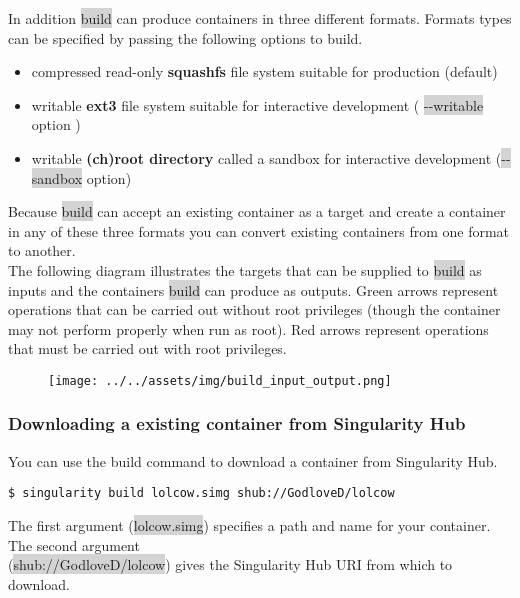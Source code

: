 \documentclass[a4paper]{article}
\begin{document}
In addition \colorbox{lightgray}{build} can produce containers in three different formats. Formats types can be specified by passing the following options to build.
\\
\begin{itemize}
\item compressed read-only \textbf{squashfs} file system suitable for production (default)
\item writable \textbf{ext3} file system suitable for interactive development ( \colorbox{lightgray}{-{}-writable} option )
\item writable \textbf{(ch)root directory} called a sandbox for interactive development (\colorbox{lightgray}{-{}-sandbox} option)
\end{itemize}

Because \colorbox{lightgray}{build} can accept an existing container as a target and create a container in any of these three formats you can convert existing containers from one format to another.\\

The following diagram illustrates the targets that can be supplied to \colorbox{lightgray}{build} as inputs and the containers \colorbox{lightgray}{build} can produce as outputs. Green arrows represent operations that can be carried out without root privileges (though the container may not perform properly when run as root). Red arrows represent operations that must be carried out with root privileges.


\begin{figure}[h]
\centering
\hspace*{-0.62in}
  {\texttt{[image: ../../assets/img/build\_input\_output.png]}}
\end{figure}

\subsubsection{Downloading a existing container from Singularity Hub}
You can use the build command to download a container from Singularity Hub.

\begin{lstlisting}[frame=single]  
$ singularity build lolcow.simg shub://GodloveD/lolcow

\end{lstlisting}

The first argument (\colorbox{lightgray}{lolcow.simg}) specifies a path and name for your container. The second argument \\(\colorbox{lightgray}{shub://GodloveD/lolcow}) gives the Singularity Hub URI from which to download.\\
\end{document}
